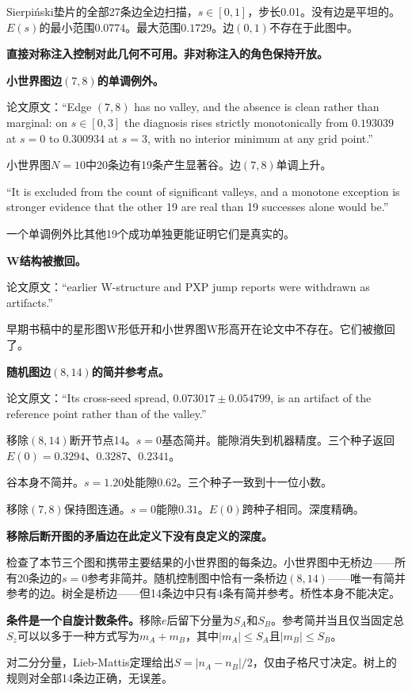 \documentclass[11pt,a4paper]{book}
\theoremstyle{definition}
\begin{document}
Sierpiński垫片的全部27条边全边扫描，$s\in[0,1]$，步长0.01。没有边是平坦的。$E(s)$的最小范围$0.0774$。最大范围$0.1729$。边$(0,1)$不存在于此图中。

\textbf{直接对称注入控制对此几何不可用。非对称注入的角色保持开放。}

\textbf{小世界图边$(7,8)$的单调例外。}

论文原文：“Edge $(7,8)$ has no valley, and the absence is clean rather than marginal: on $s\in[0,3]$ the diagnosis rises strictly monotonically from $0.193039$ at $s=0$ to $0.300934$ at $s=3$, with no interior minimum at any grid point.”

小世界图$N=10$中20条边有19条产生显著谷。边$(7,8)$单调上升。

“It is excluded from the count of significant valleys, and a monotone exception is stronger evidence that the other 19 are real than 19 successes alone would be.”

一个单调例外比其他19个成功单独更能证明它们是真实的。

\textbf{W结构被撤回。}

论文原文：“earlier W-structure and PXP jump reports were withdrawn as artifacts.”

早期书稿中的星形图W形低开和小世界图W形高开在论文中不存在。它们被撤回了。

\textbf{随机图边$(8,14)$的简并参考点。}

论文原文：“Its cross-seed spread, $0.073017\pm0.054799$, is an artifact of the reference point rather than of the valley.”

移除$(8,14)$断开节点14。$s=0$基态简并。能隙消失到机器精度。三个种子返回$E(0)=0.3294$、$0.3287$、$0.2341$。

谷本身不简并。$s=1.20$处能隙$0.62$。三个种子一致到十一位小数。

移除$(7,8)$保持图连通。$s=0$能隙$0.31$。$E(0)$跨种子相同。深度精确。

\textbf{移除后断开图的矛盾边在此定义下没有良定义的深度。}

检查了本节三个图和携带主要结果的小世界图的每条边。小世界图中无桥边——所有20条边的$s=0$参考非简并。随机控制图中恰有一条桥边$(8,14)$——唯一有简并参考的边。树全是桥边——但14条边中只有4条有简并参考。桥性本身不能决定。

\textbf{条件是一个自旋计数条件。}移除$e$后留下分量为$S_A$和$S_B$。参考简并当且仅当固定总$S_z$可以以多于一种方式写为$m_A+m_B$，其中$|m_A|\le S_A$且$|m_B|\le S_B$。

对二分分量，Lieb-Mattis定理给出$S=|n_A-n_B|/2$，仅由子格尺寸决定。树上的规则对全部14条边正确，无误差。
\end{document}
